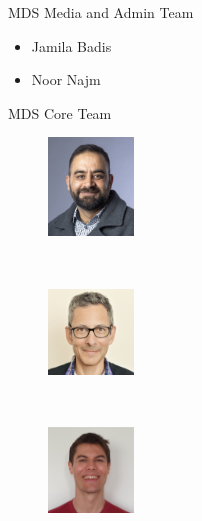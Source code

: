 \documentclass[
  ignorenonframetext,
  aspectratio=169,
]{beamer}
\providecommand{\tightlist}{%
  \setlength{\itemsep}{0pt}\setlength{\parskip}{0pt}}\usepackage{longtable,booktabs,array}
\begin{document}
\begin{frame}{MDS Media and Admin Team}
\label{mds-media-and-admin-team}
\begin{itemize}
\tightlist
\item
  Jamila Badis
\item
  Noor Najm
\end{itemize}
\end{frame}

\begin{frame}{MDS Core Team}
\label{mds-core-team}
\begin{figure}

\begin{minipage}{0.40\linewidth}
\includegraphics[width=0.9in,height=\textheight]{figs/usman-a.jpeg}\end{minipage}%
%
\begin{minipage}{0.20\linewidth}
~\end{minipage}%
%
\begin{minipage}{0.40\linewidth}
\includegraphics[width=0.9in,height=\textheight]{figs/joe-b.jpg}\end{minipage}%
\newline
\begin{minipage}{0.30\linewidth}
~\end{minipage}%
%
\begin{minipage}{0.40\linewidth}
\includegraphics[width=0.9in,height=\textheight]{figs/chris-s.png}\end{minipage}%
%
\begin{minipage}{0.30\linewidth}
~\end{minipage}%
\newline
\begin{minipage}{0.40\linewidth}

\end{minipage}
\end{figure}
\end{frame}
\end{document}
